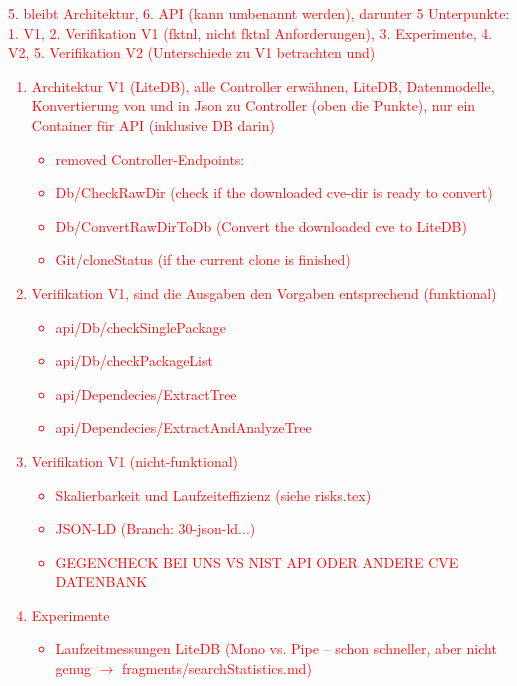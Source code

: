     \textcolor{red}{
        5. bleibt Architektur, 6. API (kann umbenannt werden), darunter 5 Unterpunkte: 1. V1, 2. Verifikation V1 (fktnl, nicht fktnl Anforderungen), 3. Experimente, 4. V2, 5. Verifikation V2 (Unterschiede zu V1 betrachten und)
        \begin{enumerate}
            \item Architektur V1 (LiteDB), alle Controller erwähnen, LiteDB, Datenmodelle, Konvertierung von und in Json zu Controller (oben die Punkte), nur ein Container für API (inklusive DB darin)
            \begin{itemize}
                \item removed Controller-Endpoints:
                \item Db/CheckRawDir (check if the downloaded cve-dir is ready to convert)
                \item Db/ConvertRawDirToDb (Convert the downloaded cve to LiteDB)
                \item Git/cloneStatus (if the current clone is finished)
            \end{itemize}
            \item Verifikation V1, sind die Ausgaben den Vorgaben entsprechend (funktional)
            \begin{itemize}
                \item api/Db/checkSinglePackage
                \item api/Db/checkPackageList
                \item api/Dependecies/ExtractTree
                \item api/Dependecies/ExtractAndAnalyzeTree
            \end{itemize}
            \item Verifikation V1 (nicht-funktional)
            \begin{itemize}
                \item Skalierbarkeit und Laufzeiteffizienz (siehe risks.tex)
                \item JSON-LD (Branch: 30-json-ld...)
                \item GEGENCHECK BEI UNS VS NIST API ODER ANDERE CVE DATENBANK
            \end{itemize}
            \item Experimente
            \begin{itemize}
                \item Laufzeitmessungen LiteDB (Mono vs. Pipe -- schon schneller, aber nicht genug $\rightarrow$ fragments/searchStatistics.md)

\end{itemize}
\end{enumerate}}
